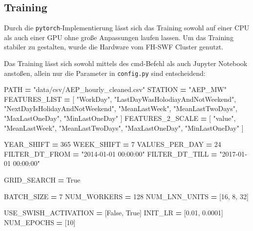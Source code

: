 \documentclass[11pt,ngerman,a4paper,]{article}
\newenvironment{Shaded}{\begin{snugshade}}{\end{snugshade}}
\newcommand{\DecValTok}[1]{\textcolor[rgb]{0.00,0.00,0.81}{#1}}
\newcommand{\FloatTok}[1]{\textcolor[rgb]{0.00,0.00,0.81}{#1}}
\newcommand{\NormalTok}[1]{#1}
\newcommand{\OperatorTok}[1]{\textcolor[rgb]{0.81,0.36,0.00}{\textbf{#1}}}
\newcommand{\StringTok}[1]{\textcolor[rgb]{0.31,0.60,0.02}{#1}}
\newcommand{\VariableTok}[1]{\textcolor[rgb]{0.00,0.00,0.00}{#1}}
\begin{document}
\subsection{Training}\label{training}

Durch die \texttt{pytorch}-Implementierung lässt sich das Training sowohl auf einer CPU als auch einer GPU ohne große Anpassungen laufen lassen. Um das Training stabiler zu gestalten, wurde die Hardware vom FH-SWF Cluster genutzt.

Das Training lässt sich sowohl mittels des cmd-Befehl als auch Jupyter Notebook anstoßen, allein nur die Parameter in \texttt{config.py} sind entscheidend:

\clearpage
\newpage

\singlespacing

\begin{Shaded}
\begin{Highlighting}[numbers=left,,]
\NormalTok{PATH }\OperatorTok{=} \StringTok{"data/csv/AEP\_hourly\_cleaned.csv"}
\NormalTok{STATION }\OperatorTok{=} \StringTok{"AEP\_MW"}
\NormalTok{FEATURES\_LIST }\OperatorTok{=}\NormalTok{ [}
    \StringTok{"WorkDay"}\NormalTok{,}
    \StringTok{"LastDayWasHolodiayAndNotWeekend"}\NormalTok{,}
    \StringTok{"NextDayIsHolidayAndNotWeekend"}\NormalTok{,}
    \StringTok{"MeanLastWeek"}\NormalTok{,}
    \StringTok{"MeanLastTwoDays"}\NormalTok{,}
    \StringTok{"MaxLastOneDay"}\NormalTok{,}
    \StringTok{"MinLastOneDay"}
\NormalTok{]}
\NormalTok{FEATURES\_2\_SCALE }\OperatorTok{=}\NormalTok{ [}
    \StringTok{"value"}\NormalTok{,}
    \StringTok{"MeanLastWeek"}\NormalTok{,}
    \StringTok{"MeanLastTwoDays"}\NormalTok{,}
    \StringTok{"MaxLastOneDay"}\NormalTok{,}
    \StringTok{"MinLastOneDay"}
\NormalTok{]}

\NormalTok{YEAR\_SHIFT }\OperatorTok{=} \DecValTok{365}
\NormalTok{WEEK\_SHIFT }\OperatorTok{=} \DecValTok{7}
\NormalTok{VALUES\_PER\_DAY }\OperatorTok{=} \DecValTok{24}
\NormalTok{FILTER\_DT\_FROM }\OperatorTok{=} \StringTok{"2014{-}01{-}01 00:00:00"}
\NormalTok{FILTER\_DT\_TILL }\OperatorTok{=} \StringTok{"2017{-}01{-}01 00:00:00"}

\NormalTok{GRID\_SEARCH }\OperatorTok{=} \VariableTok{True}

\NormalTok{BATCH\_SIZE }\OperatorTok{=} \DecValTok{7}
\NormalTok{NUM\_WORKERS }\OperatorTok{=} \DecValTok{128}
\NormalTok{NUM\_LNN\_UNITS }\OperatorTok{=}\NormalTok{ [}\DecValTok{16}\NormalTok{, }\DecValTok{8}\NormalTok{, }\DecValTok{32}\NormalTok{]}

\NormalTok{USE\_SWISH\_ACTIVATION }\OperatorTok{=}\NormalTok{ [}\VariableTok{False}\NormalTok{, }\VariableTok{True}\NormalTok{]}
\NormalTok{INIT\_LR }\OperatorTok{=}\NormalTok{ [}\FloatTok{0.01}\NormalTok{, }\FloatTok{0.0001}\NormalTok{]}
\NormalTok{NUM\_EPOCHS }\OperatorTok{=}\NormalTok{ [}\DecValTok{10}\NormalTok{]}
\end{Highlighting}
\end{Shaded}
\end{document}
